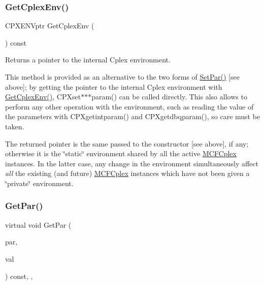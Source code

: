 \subsubsection{\texorpdfstring{Get\+Cplex\+Env()}{GetCplexEnv()}}
{\footnotesize\ttfamily C\+P\+X\+E\+N\+Vptr Get\+Cplex\+Env (\begin{DoxyParamCaption}\item[{void}]{ }\end{DoxyParamCaption}) const\hspace{0.3cm}{\ttfamily [inline]}}

Returns a pointer to the internal Cplex environment.

This method is provided as an alternative to the two forms of \mbox{\hyperlink{class_m_c_f_cplex_a12105bbd99b8b7ad7efae3bb0c222b3c}{Set\+Par()}} \mbox{[}see above\mbox{]}; by getting the pointer to the internal Cplex environment with \mbox{\hyperlink{class_m_c_f_cplex_a8d6c10adf2fc39afc2a49bebf57f141b}{Get\+Cplex\+Env()}}, C\+P\+Xset$\ast$$\ast$$\ast$param() can be called directly. This also allows to perform any other operation with the environment, such as reading the value of the parameters with C\+P\+Xgetintparam() and C\+P\+Xgetdbqparam(), so care must be taken.

The returned pointer is the same passed to the constructor \mbox{[}see above\mbox{]}, if any; otherwise it is the \char`\"{}static\char`\"{} environment shared by all the active \mbox{\hyperlink{class_m_c_f_cplex}{M\+C\+F\+Cplex}} instances. In the latter case, any change in the environment simultaneously affect {\itshape all} the existing (and future) \mbox{\hyperlink{class_m_c_f_cplex}{M\+C\+F\+Cplex}} instances which have not been given a \char`\"{}private\char`\"{} environment. \mbox{\label{class_m_c_f_cplex_aebb293732f2fd2767e9ebc5e8ccae338}} 
\subsubsection{\texorpdfstring{Get\+Par()}{GetPar()}}
{\footnotesize\ttfamily virtual void Get\+Par (\begin{DoxyParamCaption}\item[{int}]{par,  }\item[{int \&}]{val }\end{DoxyParamCaption}) const\hspace{0.3cm}{\ttfamily [inline]}, {\ttfamily [override]}, {\ttfamily [virtual]}}

